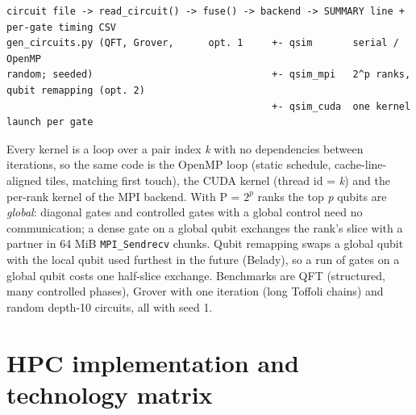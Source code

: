 \documentclass[10pt,a4paper]{article}
\begin{document}
\begin{verbatim}
circuit file -> read_circuit() -> fuse() -> backend -> SUMMARY line + per-gate timing CSV
gen_circuits.py (QFT, Grover,      opt. 1     +- qsim       serial / OpenMP
random; seeded)                               +- qsim_mpi   2^p ranks, qubit remapping (opt. 2)
                                              +- qsim_cuda  one kernel launch per gate
\end{verbatim}



Every kernel is a loop over a pair index \emph{k} with no dependencies between iterations, so the same code is the OpenMP loop (static schedule, cache-line-aligned tiles, matching first touch), the CUDA kernel (thread id = \emph{k}) and the per-rank kernel of the MPI backend. With P = $2^{p}$ ranks the top \emph{p} qubits are \emph{global}: diagonal gates and controlled gates with a global control need no communication; a dense gate on a global qubit exchanges the rank's slice with a partner in 64 MiB \texttt{MPI\_Sendrecv} chunks. Qubit remapping swaps a global qubit with the local qubit used furthest in the future (Belady), so a run of gates on a global qubit costs one half-slice exchange. Benchmarks are QFT (structured, many controlled phases), Grover with one iteration (long Toffoli chains) and random depth-10 circuits, all with seed 1.



\section{HPC implementation and technology matrix}
\end{document}
